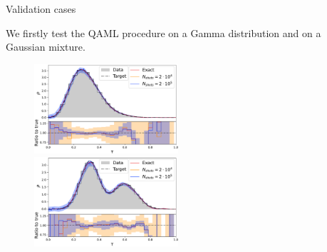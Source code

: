 \documentclass[20pt, final]{beamer}
\newlength{\colwidth}
\begin{document}
\begin{frame}[t]
\begin{columns}[t]
\begin{column}{\colwidth}
\end{column}

\begin{column}{\colwidth}

 \begin{block}{Validation cases}

  We firstly test the QAML procedure on a Gamma distribution and on a Gaussian 
  mixture.

    \begin{figure}
    \includegraphics[width=0.5\textwidth]{figures/gamma_pdf.pdf}%
    \includegraphics[width=0.5\textwidth]{figures/gauss_pdf.pdf}
    \end{figure}

  \end{block}


\end{column}
\end{columns}
\end{frame}
\end{document}
